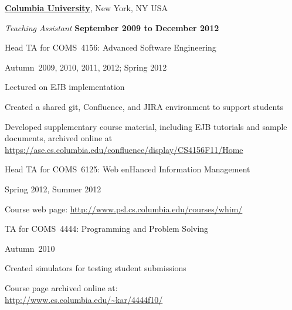 \documentclass[10pt]{article}
\begin{document}
\href{http://www.columbia.edu}{\textbf{Columbia University}},
New York, NY USA
\begin{outerlist}
\item[] \textit{Teaching Assistant}%
    \hfill \textbf{September 2009 to December 2012}
    \begin{innerlist}%
       \item Head TA for COMS~4156: Advanced Software Engineering %
        \begin{innerlist}
            \item Autumn~2009, 2010, 2011, 2012; Spring 2012 
            \item Lectured on EJB implementation
            \item Created a shared git, Confluence, and JIRA environment to support students
            \item Developed supplementary course
                material, including EJB tutorials and sample documents, archived online at \\
                 \url{https://ase.cs.columbia.edu/confluence/display/CS4156F11/Home}
        \end{innerlist}
            \item Head TA for COMS~6125: Web enHanced Information Management
            \begin{innerlist}
	   \item Spring 2012, Summer 2012
            \item Course web page: 
                 \url{http://www.psl.cs.columbia.edu/courses/whim/}
        \end{innerlist}

         \item TA for COMS~4444: Programming and Problem Solving
        \begin{innerlist}
            \item Autumn~2010
            \item Created simulators for testing student submissions
            \item Course page archived online at: \\
            \href{http://www.cs.columbia.edu/~kar/4444f10/}{http://www.cs.columbia.edu/\~{}kar/4444f10/}
        \end{innerlist}
\end{innerlist}

\end{outerlist}
\end{document}
